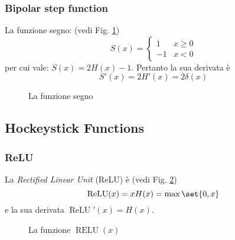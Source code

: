 \documentclass[10pt]{book}
\newcommand{\1}{\mathds{1}}
\theoremstyle{definition}%
\theoremstyle{plain}
\theoremstyle{remark}
\begin{document}
\subsubsection{Bipolar step function}
\label{sec:orgc3bd3eb}

La funzione segno: (vedi Fig. \ref{fig:bip})
\begin{equation*}
S(x)= \begin{cases}
1 & x\ge{0}\\
-1 & x<0
\end{cases}
\end{equation*}
per cui vale: \(S(x)=2H(x)-1\). Pertanto la sua derivata è
\begin{equation*}
S'(x) = 2H'(x)=2\delta(x)
\end{equation*}
\begin{figure}
\begin{center}
\end{center}
\caption{La funzione segno}\label{fig:bip}
\end{figure}
\subsection{Hockeystick Functions}
\label{sec:org96dbbde}

\subsubsection{ReLU}
\label{sec:org3289608}

La \emph{Rectified Linear Unit} (ReLU) è (vedi Fig. \ref{fig:relu})
\begin{equation*}
\operatorname{ReLU}(x) = xH(x) = \max\set{0,x}
\end{equation*}
e la sua derivata \(\operatorname{ReLU}'(x) = H(x)\).

\begin{figure}
\begin{center}
\end{center}
\caption{La funzione \(\operatorname{RELU}(x)\)}\label{fig:relu}
\end{figure}
\end{document}
